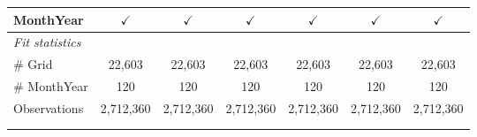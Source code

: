 \begin{table}[htbp]
\begin{tabular}{lcccccc}
      MonthYear                        & $\checkmark$  & $\checkmark$  & $\checkmark$  & $\checkmark$  & $\checkmark$  & $\checkmark$\\   
      \midrule
      \emph{Fit statistics}\\
      \# Grid                          & 22,603        & 22,603        & 22,603        & 22,603        & 22,603        & 22,603\\  
      \# MonthYear                     & 120           & 120           & 120           & 120           & 120           & 120\\  
      Observations                     & 2,712,360     & 2,712,360     & 2,712,360     & 2,712,360     & 2,712,360     & 2,712,360\\  
      \midrule \midrule
                                       &               &               &               &               &               &  \tabularnewline 
      \\
   \end{tabular}
\end{table}


